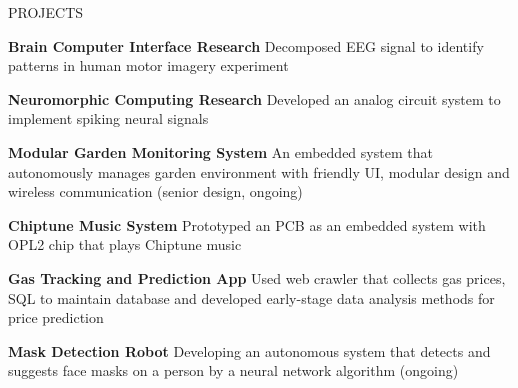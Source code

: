 \documentclass{resume} %
\begin{document}
	
	\begin{rSection}{PROJECTS}
		\vspace{-1em}
		\item \textbf{Brain Computer Interface Research} {Decomposed EEG signal to identify patterns in human motor imagery experiment}
		
		\item \textbf{Neuromorphic Computing Research} {Developed an analog circuit system to implement spiking neural signals}
		
		
		\item \textbf{Modular Garden Monitoring System} {An embedded system that autonomously manages garden environment with friendly UI, modular design and wireless communication (senior design, ongoing)}
		
		\item \textbf{Chiptune Music System} {Prototyped an PCB as an embedded system with OPL2 chip that plays Chiptune music}
		
		\item \textbf{Gas Tracking and Prediction App} {Used web crawler that collects gas prices, SQL to maintain database and developed early-stage data analysis methods for price prediction}
		
		\item \textbf{Mask Detection Robot} {Developing an autonomous system that detects and suggests face masks on a person by a neural network algorithm (ongoing)}
		
		
	\end{rSection} 
	
%		
%		
%	
%		
%		
	
	
\end{document}
